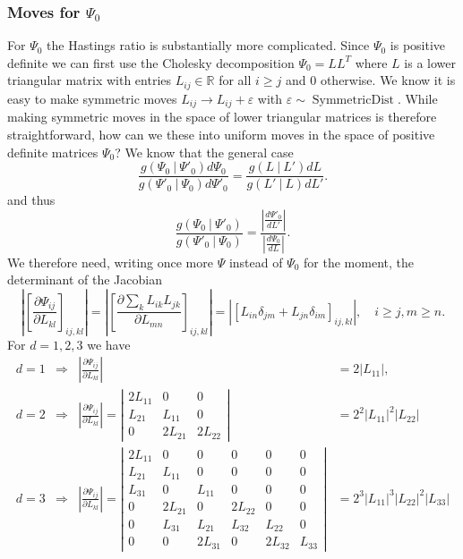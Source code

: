 \documentclass[11pt, oneside]{article}   	%
\begin{document}
\subsubsection{Moves for $\Psi_0$}
For $\Psi_0$ the Hastings ratio is substantially more complicated. Since $\Psi_0$ is positive definite we can first use the Cholesky decomposition $\Psi_0 = L L^T$ where $L$ is a lower triangular matrix with entries $L_{ij}\in\mathbb{R}$ for all $i \ge j$ and $0$ otherwise. We know it is easy to make symmetric moves $L_{ij}\rightarrow L_{ij} + \varepsilon$ with $\varepsilon\sim\operatorname{SymmetricDist}$. While making symmetric moves in the space of lower triangular matrices is therefore straightforward, how can we these into uniform moves in the space of positive definite matrices $\Psi_0$? We know that the general case
$$\frac{g(\Psi_0~\vert~\Psi'_0)d\Psi_0}{g(\Psi'_0~\vert~\Psi_0)d\Psi'_0} = \frac{g(L~\vert~L')dL}{g(L'~\vert~L)dL'}.$$
and thus
$$\frac{g(\Psi_0~\vert~\Psi'_0)}{g(\Psi'_0~\vert~\Psi_0)} = \frac{\left\vert\frac{d\Psi'_0}{dL'}\right\vert}{\left\vert\frac{d\Psi_0}{dL}\right\vert}.$$
We therefore need, writing once more $\Psi$ instead of $\Psi_0$ for the moment, the determinant of the Jacobian
$$\left\vert\left[\frac{\partial\Psi_{ij}}{\partial L_{kl}}\right]_{ij,kl}\right\vert = \left\vert\left[\frac{\partial\sum_{k}L_{ik}L_{jk}}{\partial L_{mn}}\right]_{ij,kl}\right\vert = \left\vert\left[L_{in}\delta_{jm} + L_{jn}\delta_{im}\right]_{ij,kl}\right\vert,\quad i\ge j, m\ge n.$$
For $d=1,2,3$ we have
\begin{equation}\begin{aligned}
d = 1 & \Rightarrow & \left\vert\frac{\partial\Psi_{ij}}{\partial L_{kl}}\right\vert &= 2 \vert L_{11}\vert,\\
d = 2 & \Rightarrow & \left\vert\frac{\partial\Psi_{ij}}{\partial L_{kl}}\right\vert = \left\vert\begin{array}{ccc}
2L_{11} & 0 & 0\\
L_{21} & L_{11} & 0 \\
0 & 2L_{21} & 2L_{22}
\end{array}\right\vert &= 2^2 \vert L_{11}\vert^2 \vert L_{22}\vert\\
d = 3 & \Rightarrow &  \left\vert\frac{\partial\Psi_{ij}}{\partial L_{kl}}\right\vert = \left\vert\begin{array}{cccccc}
2L_{11} & 0 & 0 & 0 & 0 & 0 \\
L_{21} & L_{11} & 0 & 0 & 0 & 0 \\
L_{31} & 0 & L_{11} & 0 & 0 & 0 \\
0 & 2 L_{21} & 0 & 2 L_{22} & 0 & 0 \\
0 & L_{31} & L_{21} & L_{32} & L_{22} & 0\\
0 & 0 & 2L_{31} & 0 & 2 L_{32} & L_{33}
\end{array}\right\vert &= 2^3 \vert L_{11}\vert^3 \vert L_{22}\vert^2 \vert L_{33}\vert
\end{aligned}\end{equation}
\end{document}
